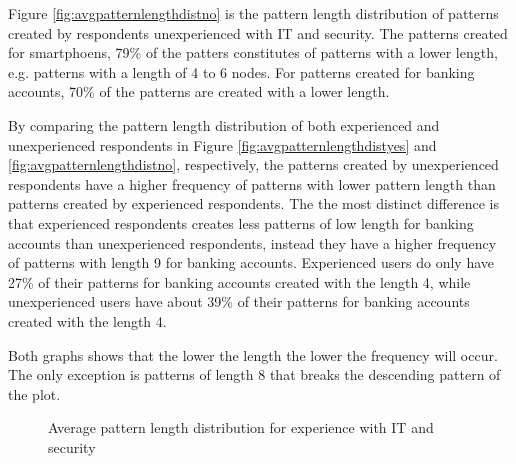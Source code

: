       Figure \ref{fig:avgpatternlengthdistno} is the pattern length distribution of patterns created by respondents unexperienced with IT and security. The patterns created for smartphoens, 79\% of the patters constitutes of patterns with a lower length, e.g. patterns with a length of 4 to 6 nodes. For patterns created for banking accounts, 70\% of the patterns are created with a lower length.

      By comparing the pattern length distribution of both experienced and unexperienced respondents in Figure \ref{fig:avgpatternlengthdistyes} and \ref{fig:avgpatternlengthdistno}, respectively, the patterns created by unexperienced respondents have a higher frequency of patterns with lower pattern length than patterns created by experienced respondents. The the most distinct difference is that experienced respondents creates less patterns of low length for banking accounts than unexperienced respondents, instead they have a higher frequency of patterns with length 9 for banking accounts. Experienced users do only have 27\% of their patterns for banking accounts created with the length 4, while unexperienced users have about 39\% of their patterns for banking accounts created with the length 4. 

      Both graphs shows that the lower the length the lower the frequency will occur. The only exception is patterns of length 8 that breaks the descending pattern of the plot. 

      \begin{figure}[H]
        \centering
        \caption{Average pattern length distribution for experience with IT and security}
        \label{fig:avgpatterndistexperience}
      \end{figure}

